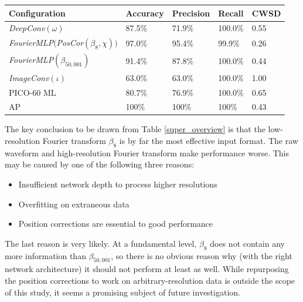 \documentclass[10pt]{article}
\begin{document}
\begin{minipage}{\textwidth}
    \begin{center}
         \label{super_overview}
        \begin{tabular}{|l|l|l|l|l|}
            \hline
            Configuration & Accuracy & Precision & Recall & CWSD \\
            \hline
            {\it DeepConv}$(\omega)$ & 87.5\% & 71.9\% & 100.0\% & 0.55 \\
            \hline
            {\it FourierMLP}$(${\it PosCor}$(\beta_{8}, \chi))$ & 97.0\% & 95.4\% & 99.9\% & 0.26 \\
            \hline
            {\it FourierMLP}$(\beta_{50,001})$ & 91.4\% & 87.8\% & 100.0\% & 0.44 \\
            \hline
            {\it ImageConv}$(\iota)$ & 63.0\% & 63.0\% & 100.0\% & 1.00 \\
            \hline
            PICO-60 ML & 80.7\% & 76.9\% & 100.0\% & 0.65 \\
            \hline
            AP & 100\% & 100\% & 100\% & 0.43 \\
            \hline
        \end{tabular}
    \end{center}
\end{minipage}

The key conclusion to be drawn from Table \ref{super_overview} is that the low-resolution Fourier transform $\beta_{8}$ is by far the most effective input format. The raw waveform and high-resolution Fourier transform make performance worse. This may be caused by one of the following three reasons:

\begin{itemize}
    \item Insufficient network depth to process higher resolutions
    \item Overfitting on extraneous data
    \item Position corrections are essential to good performance
\end{itemize}

The last reason is very likely. At a fundamental level, $\beta _8$ does not contain any more information than $\beta _{50,001}$, so there is no obvious reason why (with the right network architecture) it should not perform at least as well. While repurposing the position corrections to work on arbitrary-resolution data is outside the scope of this study, it seems a promising subject of future investigation.
\end{document}
